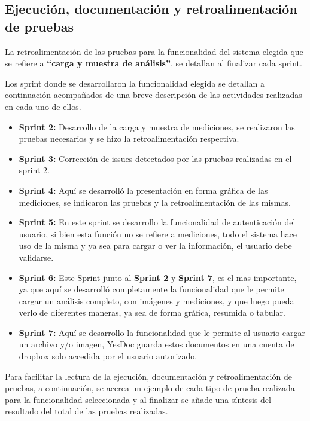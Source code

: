 \subsection{Ejecución, documentación y retroalimentación de pruebas}
 La retroalimentación de las pruebas para la funcionalidad del sistema elegida que se refiere a \textbf{``carga y muestra de análisis''}, se detallan al finalizar cada sprint.
 
  Los sprint donde se desarrollaron la funcionalidad elegida se detallan a continuación acompañados de una breve descripción de las actividades realizadas en cada uno de ellos.
 \begin{itemize}
 	\item \textbf{Sprint 2:} Desarrollo de la carga y muestra de mediciones, se realizaron las pruebas necesarios y se hizo la retroalimentación respectiva.
 	\item \textbf{Sprint 3:} Corrección de issues detectados por las pruebas realizadas en el sprint 2.
 	\item \textbf{Sprint 4:} Aquí se desarrolló la presentación en forma gráfica de las mediciones, se indicaron las pruebas y la retroalimentación de las mismas.
 	\item \textbf{Sprint 5:} En este sprint se desarrollo la funcionalidad de autenticación del usuario, si bien esta función no se refiere a mediciones, todo el sistema hace uso de la misma y ya sea para cargar o ver la información, el usuario debe validarse.
 	\item \textbf{Sprint 6: } Este Sprint junto al \textbf{Sprint 2} y \textbf{Sprint 7}, es el mas importante, ya que aquí se desarrolló completamente la funcionalidad que le permite cargar un análisis completo, con imágenes y mediciones,  y que luego pueda verlo de diferentes maneras, ya sea de forma gráfica, resumida o tabular.
 	\item \textbf{Sprint 7: } Aquí se desarrollo la funcionalidad que le permite al usuario cargar un archivo y/o imagen, YesDoc guarda estos documentos en una cuenta de dropbox solo accedida por el usuario autorizado.
 \end{itemize}
 

 Para facilitar la lectura de la ejecución, documentación y retroalimentación de pruebas, a continuación, se acerca un ejemplo de cada tipo de prueba realizada para la funcionalidad seleccionada y al finalizar se añade  una síntesis del resultado del total de las pruebas realizadas.
